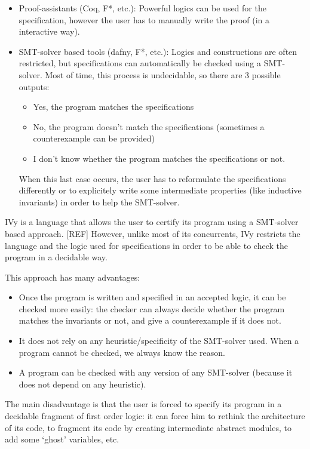 \documentclass[11pt,a4paper,oldfontcommands,openany]{memoir}
\begin{document}
    \begin{itemize}
        \item Proof-assistants (Coq, F*, etc.):
        Powerful logics can be used for the specification,
        however the user has to manually write the proof (in a interactive way).
        \item SMT-solver based tools (dafny, F*, etc.):
        Logics and constructions are often restricted, but specifications can automatically be checked using a SMT-solver.
        Most of time, this process is undecidable,
        so there are 3 possible outputs:
        \begin{itemize}
            \item Yes, the program matches the specifications
            \item No, the program doesn't match the specifications (sometimes a counterexample can be provided)
            \item I don't know whether the program matches the specifications or not.
        \end{itemize}
        When this last case occurs, the user has to reformulate the specifications differently or to explicitely write some intermediate properties (like inductive invariants)
        in order to help the SMT-solver.
    \end{itemize}

    IVy is a language that allows the user to certify its program using a SMT-solver based approach. [REF]
    However, unlike most of its concurrents, IVy restricts the language and the logic used for specifications
    in order to be able to check the program in a decidable way.

    This approach has many advantages:
    \begin{itemize}
        \item Once the program is written and specified in an accepted logic, it can be checked more easily:
        the checker can always decide whether the program matches the invariants or not, and give a counterexample if it does not.
        \item It does not rely on any heuristic/specificity of the SMT-solver used.
        When a program cannot be checked, we always know the reason.
        \item A program can be checked with any version of any SMT-solver (because it does not depend on any heuristic).
    \end{itemize}
    
    The main disadvantage is that the user is forced to specify its program in a decidable fragment of first order logic:
    it can force him to rethink the architecture of its code, to fragment its code by creating intermediate abstract modules,
    to add some `ghost' variables, etc.
\end{document}
